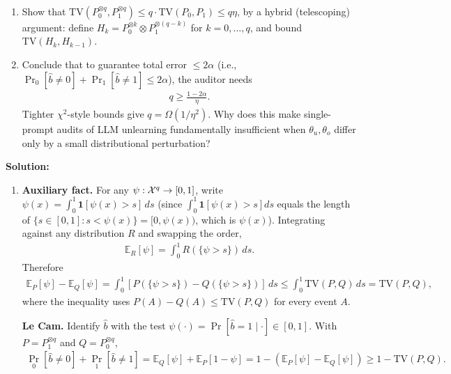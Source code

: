 \documentclass[12pt]{article}
\renewcommand{\fE}{\mathbb{E}}
\begin{document}
\begin{enumerate}
\begin{enumerate}
    \item Show that $\mathrm{TV}(P_0^{\otimes q}, P_1^{\otimes q}) \le q \cdot \mathrm{TV}(P_0, P_1) \le q\eta$, by a hybrid (telescoping) argument: define $H_k = P_0^{\otimes k} \otimes P_1^{\otimes (q-k)}$ for $k = 0, \ldots, q$, and bound $\mathrm{TV}(H_k, H_{k-1})$.

    \item Conclude that to guarantee total error $\le 2\alpha$ (i.e., $\Pr_0[\hat b \ne 0] + \Pr_1[\hat b \ne 1] \le 2\alpha$), the auditor needs
    \begin{align*}
        q \ge \frac{1 - 2\alpha}{\eta}.
    \end{align*}
    Tighter $\chi^2$-style bounds give $q = \Omega(1/\eta^2)$. Why does this make single-prompt audits of LLM unlearning fundamentally insufficient when $\theta_u, \theta_o$ differ only by a small distributional perturbation?
\end{enumerate}

\begin{solution}
{\bf Solution:}\\
\begin{enumerate}
    \item \textbf{Auxiliary fact.} For any $\psi : {\cal X}^q \to [0, 1]$, write $\psi(x) = \int_0^1 \mathbf{1}[\psi(x) > s]\, ds$ (since $\int_0^1 \mathbf{1}[\psi(x) > s] ds$ equals the length of $\{s \in [0, 1] : s < \psi(x)\} = [0, \psi(x))$, which is $\psi(x)$). Integrating against any distribution $R$ and swapping the order,
    \begin{align*}
        \fE_R[\psi] = \int_0^1 R(\{\psi > s\})\, ds.
    \end{align*}
    Therefore
    \begin{align*}
        \fE_P[\psi] - \fE_Q[\psi] = \int_0^1 [P(\{\psi > s\}) - Q(\{\psi > s\})]\, ds \le \int_0^1 \mathrm{TV}(P, Q)\, ds = \mathrm{TV}(P, Q),
    \end{align*}
    where the inequality uses $P(A) - Q(A) \le \mathrm{TV}(P, Q)$ for every event $A$.

    \textbf{Le Cam.} Identify $\hat b$ with the test $\psi(\cdot) = \Pr[\hat b = 1 \mid \cdot] \in [0, 1]$. With $P = P_1^{\otimes q}$ and $Q = P_0^{\otimes q}$,
    \begin{align*}
        \Pr_0[\hat b \ne 0] + \Pr_1[\hat b \ne 1] = \fE_Q[\psi] + \fE_P[1 - \psi] = 1 - (\fE_P[\psi] - \fE_Q[\psi]) \ge 1 - \mathrm{TV}(P, Q).
    \end{align*}


\end{enumerate}
\end{solution}
\end{enumerate}
\end{document}
